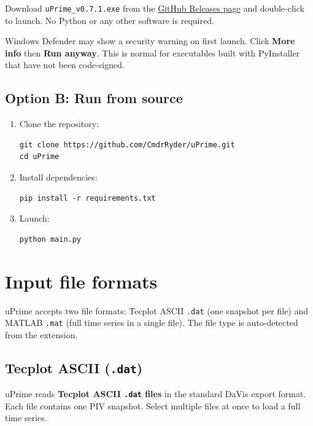 \documentclass[11pt, a4paper]{report}
\newcommand{\software}[1]{\textsf{#1}}
\begin{document}
Download \texttt{uPrime\_v0.7.1.exe} from the
\href{https://github.com/CmdrRyder/uPrime/releases}{GitHub Releases page}
and double-click to launch. No Python or any other software is required.

\begin{notebox}
Windows Defender may show a security warning on first launch. Click \textbf{More info} then \textbf{Run anyway}. This is normal for executables built with PyInstaller that have not been code-signed.
\end{notebox}

\subsection{Option B: Run from source}

\begin{enumerate}[leftmargin=1.5em]
  \item Clone the repository:
\begin{verbatim}
git clone https://github.com/CmdrRyder/uPrime.git
cd uPrime
\end{verbatim}
  \item Install dependencies:
\begin{verbatim}
pip install -r requirements.txt
\end{verbatim}
  \item Launch:
\begin{verbatim}
python main.py
\end{verbatim}
\end{enumerate}

\section{Input file formats}
\label{sec:input}

\software{uPrime} accepts two file formats: Tecplot ASCII \texttt{.dat} (one snapshot per file) and MATLAB \texttt{.mat} (full time series in a single file). The file type is auto-detected from the extension.

\subsection{Tecplot ASCII (\texttt{.dat})}

\software{uPrime} reads \textbf{Tecplot ASCII \texttt{.dat} files} in the standard DaVis export format. Each file contains one PIV snapshot. Select multiple files at once to load a full time series.
\end{document}
